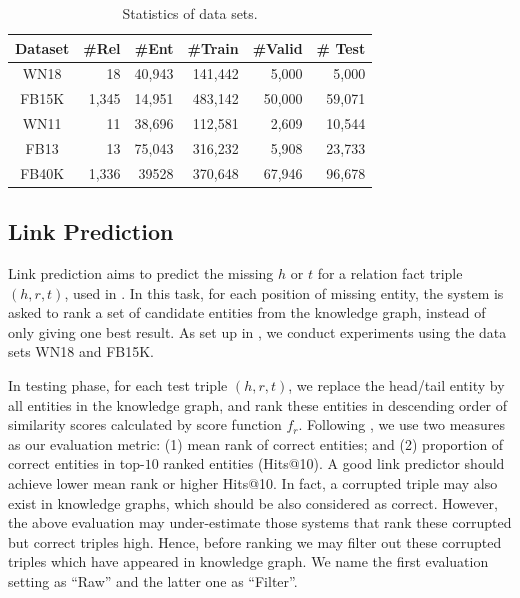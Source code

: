     \begin{table}[h]
    \small
    \centering
    \caption{Statistics of data sets.}
    \label{table:statistics}
    \begin{tabular}{|c|rrrrr|}
    \hline
    Dataset &\#Rel& \#Ent& \#Train& \#Valid& \# Test\\
    \hline
    WN18  & 18     & 40,943  &141,442 & 5,000  & 5,000\\
    FB15K & 1,345 & 14,951 & 483,142 & 50,000& 59,071\\
    WN11  &11       & 38,696 & 112,581 & 2,609  &10,544\\
    FB13   &13       & 75,043 &316,232  &5,908  &23,733\\
    FB40K & 1,336 & 39528 &370,648 &67,946&96,678\\
    \hline
    \end{tabular}
    \end{table}

    \subsection{Link Prediction}
    Link prediction aims to predict the missing $h$ or $t$ for a relation fact triple $(h, r, t)$, used in . In this task, for each position of missing entity, the system is asked to rank a set of candidate entities from the knowledge graph, instead of only giving one best result. As set up in , we conduct experiments using the data sets WN18 and FB15K.

    In testing phase, for each test triple $(h, r, t)$, we replace the head/tail entity by all entities in the knowledge graph, and rank these entities in descending order of similarity scores calculated by score function $f_r$. Following , we use two measures as our evaluation metric: (1) mean rank of correct entities; and (2) proportion of correct entities in top-$10$ ranked entities (Hits@10). A good link predictor should achieve lower mean rank or higher Hits@10. In fact, a corrupted triple may also exist in knowledge graphs, which should be also considered as correct. However, the above evaluation may under-estimate those systems that rank these corrupted but correct triples high. Hence, before ranking we may filter out these corrupted triples which have appeared in knowledge graph. We name the first evaluation setting as ``Raw'' and the latter one as ``Filter''.

